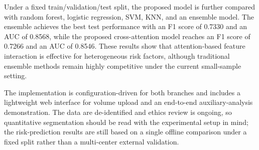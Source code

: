 Under a fixed train/validation/test split, the proposed model is further compared with random forest, logistic regression, SVM, KNN, and an ensemble model. The ensemble achieves the best test performance with an F1 score of 0.7330 and an AUC of 0.8568, while the proposed cross-attention model reaches an F1 score of 0.7266 and an AUC of 0.8546. These results show that attention-based feature interaction is effective for heterogeneous risk factors, although traditional ensemble methods remain highly competitive under the current small-sample setting.\par

The implementation is configuration-driven for both branches and includes a lightweight web interface for volume upload and an end-to-end auxiliary-analysis demonstration. The data are de-identified and ethics review is ongoing, so quantitative segmentation should be read with the experimental setup in mind; the risk-prediction results are still based on a single offline comparison under a fixed split rather than a multi-center external validation.\par
